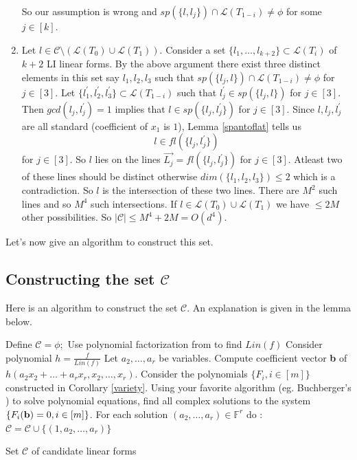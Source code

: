 \documentclass[letterpaper,USenglish,numberwithinsect]{lipics}
\newcommand{\F}{\mathbb{F}}
\newcommand{\ML}{\mathcal{L}}
\newcommand{\MC}{\mathcal{C}}
\newcommand{\B}[1]{\bar{#1}}
\begin{document}
\begin{enumerate}
So our assumption is wrong and $sp(\{l,l_j\})\cap \ML(T_{1-i}) \neq \phi$ for
some $j\in [k]$.
\item  Let $l\in \MC\setminus (\ML(T_0)\cup \ML(T_1))$. Consider a set $\{l_1,\ldots,l_{k+2}\}\subset \ML(T_i)$
of $k+2$ LI linear forms. By the above argument there exist three distinct elements in this set say $l_1,l_2,l_3$ such that
$sp(\{l_j,l\})\cap \ML(T_{1-i})\neq \phi$ for $j\in [3]$. Let $\{l_1^\prime,l_2^\prime,l_3^\prime\} \subset \ML(T_{1-i})$ such that
$l_j^\prime \in sp(\{l_j,l\})$ for $j\in [3]$. Then $gcd(l_j,l_j^\prime)=1$ implies that $l\in sp(\{l_j,l_j^\prime\})$ for $j\in [3]$.
 Since $l,l_j,l_j^\prime$ are all standard (coefficient of $x_1$ is $1$), Lemma \ref{spantoflat} tells us
 \[
  l\in fl(\{l_j,l_j^\prime\})
 \]
 for $j\in [3]$. So $l$ lies on the lines $\vec{L_j} = fl(\{l_j,l_j^\prime\})$ for $j\in [3]$. Atleast two of
 these lines should be distinct otherwise $dim(\{l_1,l_2,l_3\})\leq 2$ which is a contradiction. So $l$ is the
 intersection of these two lines.
There are $M^2$ such lines and so $M^4$ such intersections. If $l\in \ML(T_0)\cup \ML(T_1)$ we have $\leq 2M$ other possibilities. So
$|\MC|\leq M^4+2M = O(d^4)$.

\end{enumerate}





Let's now give an algorithm to construct this set.
\subsection{Constructing the set $\MC$}

Here is an algorithm to construct the set $\MC$. An explanation is given in the lemma below.

\begin{algorithm}[H]\label{candidatealgo}

\Input {$f\in \Sigma\Pi\Sigma_\F(2)[\B{x}]$}
\Output {Set $\MC$ of Linear Forms}
Define $\MC=\phi;$\;
Use polynomial factorization from \cite{KalTr90} to find $Lin(f)$\;
 Consider polynomial $h=\frac{f}{Lin(f)}$\;
 Let $a_2,\ldots,a_r$ be variables.\;
 Compute coefficient vector {\bf b} of $h(a_2x_2+\ldots+a_rx_r, x_2,\ldots,x_r)$.\;
 Consider the polynomials $\{F_i, i\in [m]\}$ constructed in Corollary \ref{variety}.\;
 Using your favorite algorithm (eg. Buchberger's \cite{Buchberger76}) to solve polynomial equations, find all complex solutions to the system
$\{F_i({\bf b})=0, i\in [m]\}$.\;
 For each solution $(a_2,\ldots,a_r) \in \F^r$ do :  $\MC = \MC \cup \{(1,a_2,\ldots,a_r)\}$\;

\Return{$\MC$\;}

\caption{Set $\MC$ of candidate linear forms}
\end{algorithm}
\end{document}

